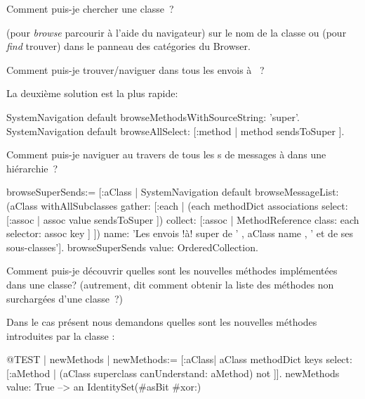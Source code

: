 \documentclass[a4paper,10pt,twoside]{book}
\begin{document}
\begin{faq}
Comment puis-je chercher une classe~?
\end{faq}
\answer
 (pour \emph{browse} \cad parcourir à l'aide du navigateur)
sur le nom de la classe ou  (pour \emph{find} \cad trouver)
dans le panneau des catégories du Browser. %

\begin{faq}
Comment puis-je trouver/naviguer dans tous les envois à \super~?
\end{faq}
\answer
La deuxième solution est la plus rapide:
\begin{code}{}
SystemNavigation default browseMethodsWithSourceString: 'super'.
SystemNavigation default browseAllSelect: [:method | method sendsToSuper ].
\end{code}

\begin{faq}
Comment puis-je naviguer au travers de tous les 
s de messages à \super dans une hiérarchie~?
\end{faq}
\answer
\begin{code}{}
browseSuperSends:= [:aClass | SystemNavigation default
	browseMessageList: (aClass withAllSubclasses gather: [:each |
		(each methodDict associations
			select: [:assoc | assoc value sendsToSuper ])
				collect: [:assoc | MethodReference class: each selector: assoc key ] ])
	name: 'Les envois !à! super de ' , aClass name , ' et de ses sous-classes'].
browseSuperSends value: OrderedCollection.
\end{code}

\begin{faq}
Comment puis-je découvrir quelles sont les nouvelles méthodes implémentées dans une classe? (autrement, dit comment obtenir la liste des méthodes non surchargées d'une classe~?) 
\end{faq}
\answer
Dans le cas présent nous demandons quelles sont les nouvelles méthodes introduites par la classe :
\begin{code}{@TEST | newMethods |}
newMethods:= [:aClass| aClass methodDict keys select:
	[:aMethod | (aClass superclass canUnderstand: aMethod) not ]].
newMethods value: True --> an IdentitySet(#asBit #xor:)
\end{code}
\end{document}
